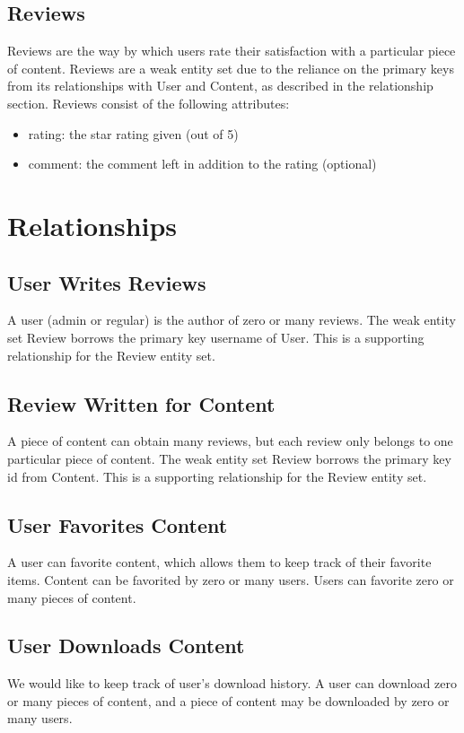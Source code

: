 \documentclass[letter, 12pt, titlepage]{article}
\begin{document}
			\subsection{Reviews}
			Reviews are the way by which users rate their satisfaction with a particular piece of content. Reviews are a weak entity set due to the reliance on the primary keys from its relationships with User and Content, as described in the relationship section. Reviews consist of the following attributes:
			\begin{itemize}
				\item rating: the star rating given (out of 5)
				\item comment: the comment left in addition to the rating (optional)
			\end{itemize}

	\section{Relationships}
		\subsection{User Writes Reviews}
			A user (admin or regular) is the author of zero or many reviews. The weak entity set Review borrows the primary key username of User. This is a supporting relationship for the Review entity set.
		\subsection{Review Written for Content}
			A piece of content can obtain many reviews, but each review only belongs to one particular piece of content. The weak entity set Review borrows the primary key id from Content. This is a supporting relationship for the Review entity set.
		\subsection{User Favorites Content}
			A user can favorite content, which allows them to keep track of their favorite items. Content can be favorited by zero or many users. Users can favorite zero or many pieces of content.	
		\subsection{User Downloads Content}
			We would like to keep track of user's download history. A user can download zero or many pieces of content, and a piece of content may be downloaded by zero or many users.
\end{document}
